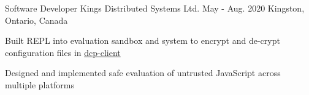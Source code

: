 \begin{cventries}
  \cventry
    {Software Developer} %
    {Kings Distributed Systems Ltd.} %
    {May - Aug. 2020} %
    {Kingston, Ontario, Canada} %
    {
      \begin{cvitems} %
        \item{Built REPL into evaluation sandbox and system to encrypt and de-crypt configuration files in \href{https://www.npmjs.com/package/dcp-client}{dcp-client}}
        \item{Designed and implemented safe evaluation of untrusted JavaScript across multiple platforms}
      \end{cvitems}
    }


\end{cventries}
